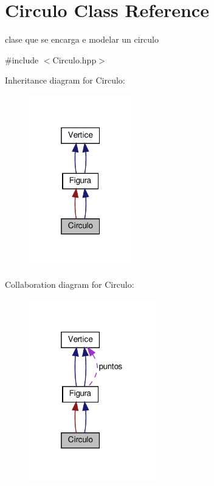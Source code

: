 \hypertarget{class_circulo}{}\section{Circulo Class Reference}
\label{class_circulo}


clase que se encarga e modelar un circulo  




{\ttfamily \#include $<$Circulo.\+hpp$>$}



Inheritance diagram for Circulo\+:
\nopagebreak
\begin{figure}[H]
\begin{center}
\leavevmode
\includegraphics[width=127pt]{class_circulo__inherit__graph}
\end{center}
\end{figure}


Collaboration diagram for Circulo\+:
\nopagebreak
\begin{figure}[H]
\begin{center}
\leavevmode
\includegraphics[width=157pt]{class_circulo__coll__graph}
\end{center}
\end{figure}

